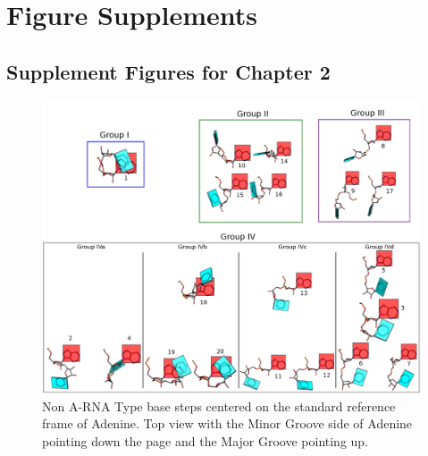 \chapter{Figure Supplements}
\label{supplements}

\section{Supplement Figures for Chapter 2}
\begin{figure}[ht]
\centering
\includegraphics[angle=90, scale=0.2]{Supplement/collage2.png}
\caption{Non A-RNA Type base steps centered on the standard reference
  frame of Adenine. Top view with the Minor Groove side of Adenine
  pointing down the page and the Major Groove pointing up.}
\label{fig:steps2}
\end{figure}

